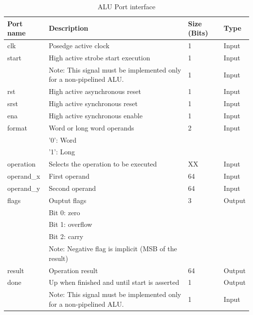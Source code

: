 \begin{table}
\begin{center}
\begin{tabu}{|X[l]|X[3,l]|X[c]|X[c]|}
\hline
\rowfont[c]\bfseries
Port name & Description & Size (Bits) & Type\\
\hline
\hline
clk                & Posedge active clock                         & 1  & Input   \\
\hline
start              & High active strobe start execution           & 1  & Input   \\
                   & Note: This signal must be implemented only for a non-pipelined ALU. & 1  & Input   \\
\hline
rst                & High active asynchronous reset               & 1  & Input   \\
\hline
srst               & High active synchronous reset                & 1  & Input   \\
\hline
ena		   & High active synchronous enable		  & 1  & Input \\
\hline
format             & Word or long word operands                   & 2  & Input   \\
                   & '0': Word                                    &    &         \\
                   & '1': Long                                    &    &         \\
\hline
operation          & Selects the operation to be executed         & XX & Input   \\
\hline
operand\_x         & First operand                                & 64 & Input   \\
\hline
operand\_y         & Second operand                               & 64 & Input   \\
\hline
flags              & Ouptut flags                                 & 3  & Output  \\
                   & Bit 0: zero                                  &    &         \\
                   & Bit 1: overflow                              &    &         \\
                   & Bit 2: carry                                 &    &         \\
                   & Note: Negative flag is implicit (MSB of the result) &    &         \\
\hline
result             & Operation result                             & 64 & Output  \\
\hline
done               & Up when finished and until start is asserted & 1  & Output  \\     
                   & Note: This signal must be implemented only for a non-pipelined ALU. & 1  & Input   \\
\hline
\end{tabu}
\end{center}
\caption{ALU Port interface}
\label{tbl:alu_interface}
\end{table}

